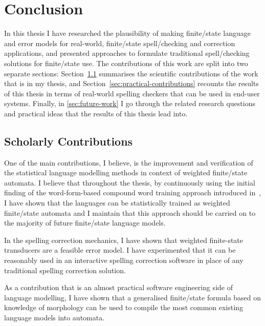 \documentclass[officiallayout,final]{unihelcompling}
\begin{document}
\chapter{Conclusion}
\label{chap:conclusion}

In this thesis I have researched the plausibility of making finite\-/state
language and error models for real-world, finite\-/state spell\-/checking and
correction applications, and presented approaches to formulate traditional
spell\-/checking solutions for finite\-/state use. The contributions of this
work are split into two separate sections:
Section~\ref{sec:scholarly-contributions} summarises the scientific
contributions of the work that is in my thesis, and
Section~\ref{sec:practical-contributions} recounts the results of this thesis
in terms of real-world spelling checkers that can be used in end-user systems.
Finally, in \ref{sec:future-work} I go through the related research questions
and practical ideas that the results of this thesis lead into.

\section{Scholarly Contributions}
\label{sec:scholarly-contributions}

One of the main contributions, I believe, is the improvement and verification
of the statistical language modelling methods in context of weighted
finite\-/state automata. I believe that throughout the thesis, by continuously
using the initial finding of the word-form-based compound word training
approach introduced in~, I have shown that the
 languages can be
statistically trained as weighted finite\-/state automata and I maintain that
this approach should be carried on to the majority of future finite\-/state
language models.

In the spelling correction mechanics, I have shown that weighted finite-state
transducers are a feasible error model. I have experimented that it can be
reasonably used in an interactive spelling correction software in place of any
traditional spelling correction solution.


As a contribution that is an almost practical software engineering side of
language modelling, I have shown that a generalised finite\-/state formula
based on knowledge of morphology can be used to compile the most common
existing language models into automata.
\end{document}
